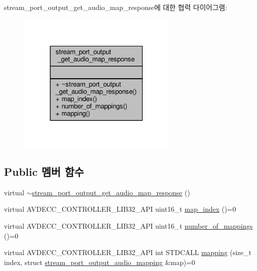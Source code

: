 stream\+\_\+port\+\_\+output\+\_\+get\+\_\+audio\+\_\+map\+\_\+response에 대한 협력 다이어그램\+:
\nopagebreak
\begin{figure}[H]
\begin{center}
\leavevmode
\includegraphics[width=219pt]{classavdecc__lib_1_1stream__port__output__get__audio__map__response__coll__graph}
\end{center}
\end{figure}
\subsection*{Public 멤버 함수}
\begin{DoxyCompactItemize}
\item 
virtual \hyperlink{classavdecc__lib_1_1stream__port__output__get__audio__map__response_aca108cc6c953765ffb832f8b02559e33}{$\sim$stream\+\_\+port\+\_\+output\+\_\+get\+\_\+audio\+\_\+map\+\_\+response} ()
\item 
virtual A\+V\+D\+E\+C\+C\+\_\+\+C\+O\+N\+T\+R\+O\+L\+L\+E\+R\+\_\+\+L\+I\+B32\+\_\+\+A\+PI uint16\+\_\+t \hyperlink{classavdecc__lib_1_1stream__port__output__get__audio__map__response_a95b259013c01868261bbe7e7d5768b59}{map\+\_\+index} ()=0
\item 
virtual A\+V\+D\+E\+C\+C\+\_\+\+C\+O\+N\+T\+R\+O\+L\+L\+E\+R\+\_\+\+L\+I\+B32\+\_\+\+A\+PI uint16\+\_\+t \hyperlink{classavdecc__lib_1_1stream__port__output__get__audio__map__response_a7f2372b5389cf9ba04675f3ef37439f3}{number\+\_\+of\+\_\+mappings} ()=0
\item 
virtual A\+V\+D\+E\+C\+C\+\_\+\+C\+O\+N\+T\+R\+O\+L\+L\+E\+R\+\_\+\+L\+I\+B32\+\_\+\+A\+PI int S\+T\+D\+C\+A\+LL \hyperlink{classavdecc__lib_1_1stream__port__output__get__audio__map__response_a2b6b11e38934fc1d17f8c3028c7776af}{mapping} (size\+\_\+t index, struct \hyperlink{structavdecc__lib_1_1stream__port__output__audio__mapping}{stream\+\_\+port\+\_\+output\+\_\+audio\+\_\+mapping} \&map)=0
\end{DoxyCompactItemize}



